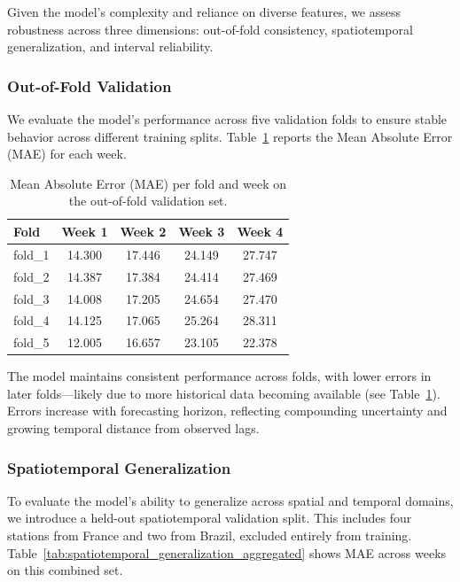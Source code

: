 \documentclass[ruler]{CUP-JNL-EDS}%
\begin{document}
Given the model's complexity and reliance on diverse features, we assess robustness across three dimensions: out-of-fold consistency, spatiotemporal generalization, and interval reliability.

\subsubsection*{Out-of-Fold Validation}
We evaluate the model's performance across five validation folds to ensure stable behavior across different training splits. Table~\ref{tab:mae_per_fold_week} reports the Mean Absolute Error (MAE) for each week.

\begin{table}[ht]
\centering
\begin{tabular}{lcccc}
\hline
\textbf{Fold} & \textbf{Week 1} & \textbf{Week 2} & \textbf{Week 3} & \textbf{Week 4} \\
\hline
fold\_1 & 14.300 & 17.446 & 24.149 & 27.747 \\
fold\_2 & 14.387 & 17.384 & 24.414 & 27.469 \\
fold\_3 & 14.008 & 17.205 & 24.654 & 27.470 \\
fold\_4 & 14.125 & 17.065 & 25.264 & 28.311 \\
fold\_5 & 12.005 & 16.657 & 23.105 & 22.378 \\
\hline
\end{tabular}
\caption{Mean Absolute Error (MAE) per fold and week on the out-of-fold validation set.}
\label{tab:mae_per_fold_week}
\end{table}

\noindent The model maintains consistent performance across folds, with lower errors in later folds—likely due to more historical data becoming available (see Table~\ref{tab:mae_per_fold_week}). Errors increase with forecasting horizon, reflecting compounding uncertainty and growing temporal distance from observed lags.

\subsubsection*{Spatiotemporal Generalization}
To evaluate the model's ability to generalize across spatial and temporal domains, we introduce a held-out spatiotemporal validation split. This includes four stations from France and two from Brazil, excluded entirely from training. Table~\ref{tab:spatiotemporal_generalization_aggregated} shows MAE across weeks on this combined set.
\end{document}
